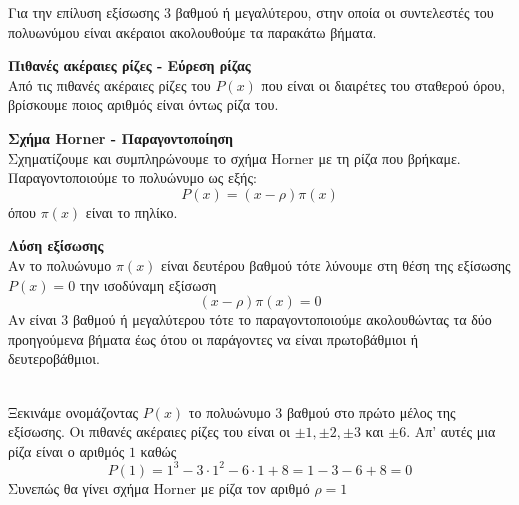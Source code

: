 \begin{Methodos}{9cm}
Για την επίλυση εξίσωσης 3 βαθμού ή μεγαλύτερου, στην οποία οι συντελεστές του πολυωνύμου είναι ακέραιοι ακολουθούμε τα παρακάτω βήματα.
\begin{bhma}
\item\textbf{Πιθανές ακέραιες ρίζες - Εύρεση ρίζας}\\
Από τις πιθανές ακέραιες ρίζες του $ P(x) $ που είναι οι διαιρέτες του σταθερού όρου, βρίσκουμε ποιος αριθμός είναι όντως ρίζα του.
\item \textbf{Σχήμα Horner - Παραγοντοποίηση}\\
Σχηματίζουμε και συμπληρώνουμε το σχήμα Horner με τη ρίζα που βρήκαμε. Παραγοντοποιούμε το πολυώνυμο ως εξής:
\[ P(x)=(x-\rho)\pi(x) \]
όπου $ \pi(x) $ είναι το πηλίκο.
\item \textbf{Λύση εξίσωσης}\\
Αν το πολυώνυμο $ \pi(x) $ είναι δευτέρου βαθμού τότε λύνουμε στη θέση της εξίσωσης $ P(x)=0 $ την ισοδύναμη εξίσωση
\[ (x-\rho)\pi(x)=0 \]
Αν είναι 3 βαθμού ή μεγαλύτερου τότε το παραγοντοποιούμε ακολουθώντας τα δύο προηγούμενα βήματα έως ότου οι παράγοντες να είναι πρωτοβάθμιοι ή δευτεροβάθμιοι.	
\end{bhma}
\end{Methodos}
\lysh\\
Ξεκινάμε ονομάζοντας $ P(x) $ το πολυώνυμο 3 βαθμού στο πρώτο μέλος της εξίσωσης. Οι πιθανές ακέραιες ρίζες του είναι οι $ \pm1, \pm2, \pm 3 $ και $ \pm 6 $. Απ' αυτές μια ρίζα είναι ο αριθμός $ 1 $ καθώς
\[ P(1)=1^3-3\cdot1^2-6\cdot 1+8=1-3-6+8=0 \]
Συνεπώς θα γίνει σχήμα Horner με ρίζα τον αριθμό $ \rho=1 $
\begin{center}
\end{center}
\\\\\\
